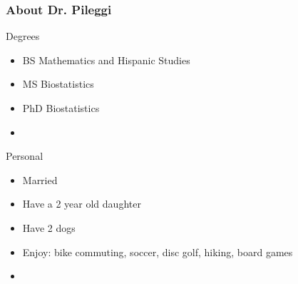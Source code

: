 \begin{frame}
\frametitle{About Dr. Pileggi}
Degrees
\begin{itemize}
\item BS Mathematics and Hispanic Studies
\item MS Biostatistics
\item PhD Biostatistics
\item[]
\end{itemize}
Personal
\begin{itemize}
\item Married
\item Have a 2 year old daughter
\item Have 2 dogs
\item Enjoy: bike commuting, soccer, disc golf, hiking, board games
\item[]
\end{itemize}
\end{frame}




